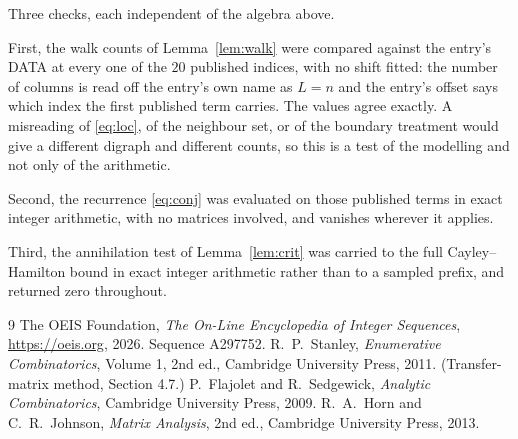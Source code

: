 \documentclass[11pt,a4paper]{article}
\theoremstyle{plain}
\theoremstyle{definition}
\begin{document}
Three checks, each independent of the algebra above.

First, the walk counts of Lemma~\ref{lem:walk} were compared against the entry's DATA at
every one of the $20$ published indices, with no shift fitted: the number of columns is
read off the entry's own name as $L=n$ and the entry's offset says which index the first
published term carries. The values agree exactly. A misreading of \eqref{eq:loc}, of the
neighbour set, or of the boundary treatment would give a different digraph and different
counts, so this is a test of the modelling and not only of the arithmetic.

Second, the recurrence \eqref{eq:conj} was evaluated on those published terms in exact
integer arithmetic, with no matrices involved, and vanishes wherever it applies.

Third, the annihilation test of Lemma~\ref{lem:crit} was carried to the full
Cayley--Hamilton bound in exact integer arithmetic rather than to a sampled prefix, and
returned zero throughout.

\begin{thebibliography}{9}
 The OEIS Foundation, \emph{The On-Line Encyclopedia of Integer
Sequences}, \url{https://oeis.org}, 2026. Sequence A297752.
 R.~P.~Stanley, \emph{Enumerative Combinatorics}, Volume 1, 2nd ed.,
Cambridge University Press, 2011. (Transfer-matrix method, Section 4.7.)
 P.~Flajolet and R.~Sedgewick, \emph{Analytic Combinatorics}, Cambridge
University Press, 2009.
 R.~A.~Horn and C.~R.~Johnson, \emph{Matrix Analysis}, 2nd ed., Cambridge
University Press, 2013.
\end{thebibliography}
\end{document}

